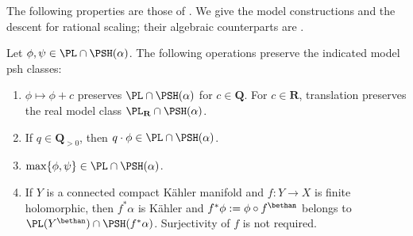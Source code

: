 The following properties are those of
\cite[Proposition~4.1.4, p.~33]{MPTropicalV2}.
We give the model constructions and the descent for rational scaling;
their algebraic counterparts are
\cite[Lemma~2.34, p.~687, and Proposition~3.6, pp.~693--694]{BJ22}.

\begin{proposition}\label{prop:mp-model-psh-stability}
Let $\phi,\psi\in\PL\cap\PSH(\alpha)$.
The following operations preserve the indicated model psh classes:
\begin{enumerate}
\item $\phi\mapsto\phi+c$ preserves
      $\PL\cap\PSH(\alpha)$ for $c\in\mathbf Q$.
      For $c\in\mathbf R$, translation preserves the real
      model class $\PL_{\mathbf R}\cap\PSH(\alpha)$.
\item If $q\in\mathbf Q_{>0}$, then
      $q\cdot\phi\in\PL\cap\PSH(\alpha)$.
\item $\max\{\phi,\psi\}\in\PL\cap\PSH(\alpha)$.
\item If $Y$ is a connected compact K\"ahler manifold and
      $f:Y\to X$ is finite holomorphic, then $f^*\alpha$ is K\"ahler and
      $f^*\phi:=\phi\circ f^{\bethan}$ belongs to
      $\PL(Y^{\bethan})\cap\PSH(f^*\alpha)$.
      Surjectivity of $f$ is not required.
\end{enumerate}
\end{proposition}

